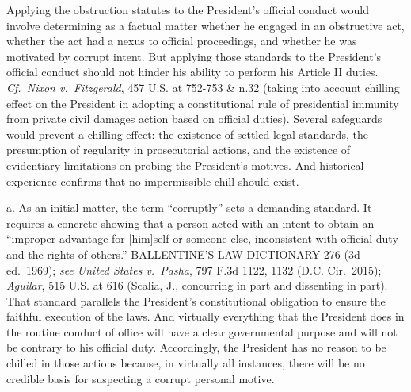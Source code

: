 Applying the obstruction statutes to the President’s official conduct would involve determining as a factual matter whether he engaged in an obstructive act, whether the act had a nexus to official proceedings, and whether he was motivated by corrupt intent.
But applying those standards to the President’s official conduct should not hinder his ability to perform his Article II duties.
\textit{Cf.~Nixon v.\ Fitzgerald}, 457 U.S. at 752-753 \& n.32 (taking into account chilling effect on the President in adopting a constitutional rule of presidential immunity from private civil damages action based on official duties).
Several safeguards would prevent a chilling effect: the existence of settled legal standards, the presumption of regularity in prosecutorial actions, and the existence of evidentiary limitations on probing the President’s motives.
And historical experience confirms that no impermissible chill should exist.

a. As an initial matter, the term “corruptly” sets a demanding standard.
It requires a concrete showing that a person acted with an intent to obtain an “improper advantage for [him]self or someone else, inconsistent with official duty and the rights of others.” BALLENTINE’S LAW DICTIONARY 276 (3d ed.~1969);
\textit{see United States v.\ Pasha}, 797 F.3d 1122, 1132 (D.C. Cir.~2015);
\textit{Aguilar}, 515 U.S. at 616 (Scalia, J., concurring in part and dissenting in part).
That standard parallels the President’s constitutional obligation to ensure the faithful execution of the laws.
And virtually everything that the President does in the routine conduct of office will have a clear governmental purpose and will not be contrary to his official duty.
Accordingly, the President has no reason to be chilled in those actions because, in virtually all instances, there will be no credible basis for suspecting a corrupt personal motive.

